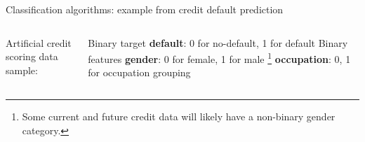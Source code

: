 \begin{frame}{Classification algorithms: example from credit default prediction}
  \begin{columns}[T] %
    \begin{column}{.48\textwidth}
      Artificial credit scoring data sample:
      \newline\newline
      \newline\newline
    \end{column}%
    \begin{column}{.48\textwidth}
      Binary target
      \newline\textbf{default}: 0 for no-default, 1 for default
      \newline\newline
      Binary features
      \newline \textbf{gender}: 0 for female, 1 for male \footnote{
        Some current and future credit data will likely have a non-binary gender category.
    } \newline
    \newline \textbf{occupation}: 0, 1 for occupation grouping \newline

    \end{column}%
\end{columns}
\end{frame}


